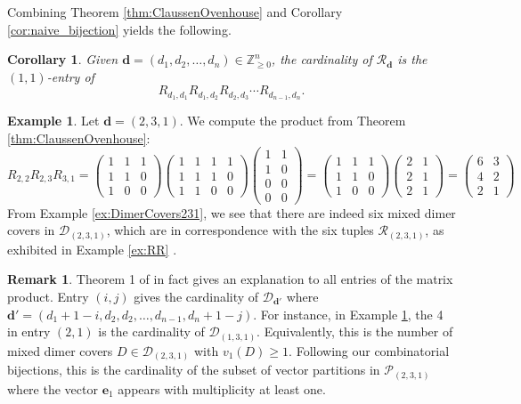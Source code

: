 \documentclass{amsart}
\def\bfd{{\mathbf{d}}}
\newtheorem{corollary}[theorem]{Corollary}
\theoremstyle{definition}
\newtheorem{example}[theorem]{Example}
\newtheorem{remark}[theorem]{Remark}
\begin{document}
Combining Theorem \ref{thm:ClaussenOvenhouse} and Corollary \ref{cor:naive_bijection} yields the following.

\begin{corollary}\label{cor:Enumeration}
Given $\mathbf{d} = (d_1,d_2,\ldots,d_n) \in \mathbb{Z}_{\ge 0}^n$, the cardinality of $\mathcal{R}_{\mathbf{d}}$ is the $(1,1)$-entry of 
\[
R_{d_1,d_1}R_{d_1,d_2} R_{d_2,d_3} \cdots R_{d_{n-1},d_n}.
    \]  
\end{corollary}

\begin{example}\label{ex:MatrixProductEnumeration}
Let $\mathbf{d} = (2,3,1)$. We compute the product from Theorem \ref{thm:ClaussenOvenhouse}: \[
R_{2,2}R_{2,3} R_{3,1} = \begin{pmatrix} 1 & 1 & 1 \\ 1 & 1& 0\\ 1 & 0 & 0 \end{pmatrix}\begin{pmatrix} 1 & 1 & 1 & 1 \\ 1 & 1 & 1 & 0 \\ 1 & 1 & 0 & 0 \end{pmatrix} \begin{pmatrix} 1 & 1 \\ 1 & 0 \\ 0 & 0 \\ 0 & 0 \end{pmatrix} = \begin{pmatrix} 1 & 1 & 1 \\ 1 & 1& 0\\ 1 & 0 & 0 \end{pmatrix}\begin{pmatrix} 2 & 1 \\ 2 & 1 \\ 2 & 1 \end{pmatrix} = \begin{pmatrix} 6 & 3\\ 4& 2 \\ 2 & 1 \end{pmatrix}
    \]
From Example \ref{ex:DimerCovers231}, we see that there are indeed six mixed dimer covers in $\mathcal{D}_{(2,3,1)}$, which are in correspondence with the six tuples $\mathcal{R}_{(2,3,1)}$, as exhibited in Example \ref{ex:RR} .
\end{example}

\begin{remark}
Theorem 1 of \cite{ClaussenOvenhouse} in fact gives an explanation to all entries of the matrix product.
Entry $(i,j)$ gives the cardinality of $\mathcal{D}_{\bfd'}$
where $\bfd'=(d_1+1-i,d_2,d_2,\ldots,d_{n-1},d_n+1-j)$. For instance, in Example \ref{ex:MatrixProductEnumeration}, the 4 in entry $(2,1)$ is the cardinality of $\mathcal{D}_{(1,3,1)}$. Equivalently, this is the number of mixed dimer covers $D \in \mathcal{D}_{(2,3,1)}$ with $v_1(D) \geq 1$. Following our combinatorial bijections, this is the cardinality of the subset of vector partitions in $\mathcal{P}_{(2,3,1)}$ where the vector $\mathbf{e}_1$ appears with multiplicity at least one.
\end{remark}
\end{document}

